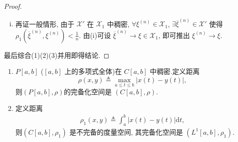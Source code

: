 \documentclass[../../main.tex]{subfiles}%
\begin{document}
\begin{proof}
\begin{enumerate}[(1)]
\begin{enumerate}[(i)]
\item 再证一般情形, 由于 $\mathscr{X}'$ 在 $\mathscr{X}_1$ 中稠密, $\forall\xi^{(n)}\in\mathscr{X}_1$, $\exists\overline{\xi}^{(n)}\in\mathscr{X}'$ 使得 $\rho_1(\overline{\xi}^{(n)},\xi^{(n)})<\frac{1}{n}$. 由(i)可设 $\overline{\xi}^{(n)}\to\xi\in\mathscr{X}_1$, 即可推出 $\xi^{(n)}\to\xi$.
\end{enumerate}
\end{enumerate}
最后综合(1)(2)(3)并用即得结论.

\end{proof}

\begin{proposition}[常见度量空间的完备化空间]\label{proposition:常见度量空间的完备化空间}
\begin{enumerate}[(1)]
\item $P[a,b]$ ($[a,b]$ 上的多项式全体)在 $C[a,b]$ 中稠密.定义距离
$$\rho(x,y)\triangleq \max_{a\leqslant t\leqslant b}|x(t)-y(t)|,$$
则$(P[a,b],\rho)$的完备化空间是 $(C[a,b],\rho)$.

\item 定义距离
\begin{align*}
\rho _1(x,y)\triangleq \int_a^b{\left| x\left( t \right) -y\left( t \right) \right|\mathrm{d}t},
\end{align*}
则$(C[a,b],\rho_1)$ 是不完备的度量空间, 其完备化空间是 $(L^1[a,b],\rho_1)$.
\end{enumerate}
\end{proposition}
\end{document}
